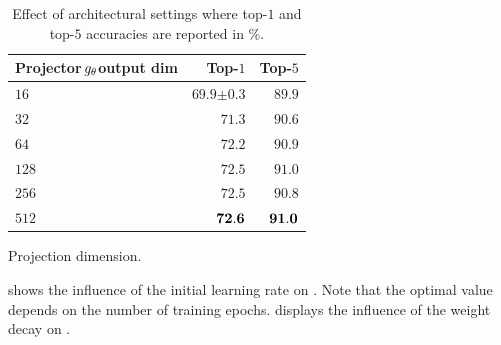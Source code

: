 \begin{table}[ht!]
\begin{minipage}{.45\linewidth}
\begin{subtable}{\linewidth}
\end{subtable}
\end{minipage}
\phantom{aaaaa}
\begin{minipage}{.45\linewidth}
\begin{subtable}{\linewidth}
    \small
    \begin{center}
        \begin{tabular}{P{2cm}rr}
        \toprule
           Projector\,$g_{\theta}$\newline output dim & Top-$1$ & Top-$5$ \\
        \midrule
                         $16$ & $69.9 {\scriptstyle \pm 0.3}$ & $89.9$ \\
                         $32$ & $71.3$ & $90.6$ \\
                         $64$ & $72.2$ & $90.9$ \\
                        $128$ & $72.5$ & $91.0$ \\
                        $256$ & $72.5$ & $90.8$ \\
                        $512$ & $\bf{72.6}$ & $\bf{91.0}$ \\
        \bottomrule
        \end{tabular}
         \caption{Projection dimension.}
         \label{table:ablation-proj-size}
     \end{center}
\end{subtable}
\end{minipage}
\caption{\label{tab:archi-all-ablations}Effect of architectural settings where top-$1$ and top-$5$ accuracies are reported in \%.}
\end{table}

 shows the influence of the initial learning rate on \algo. Note that the optimal value depends on the number of training epochs.  displays the influence of the weight decay on \algo. 

